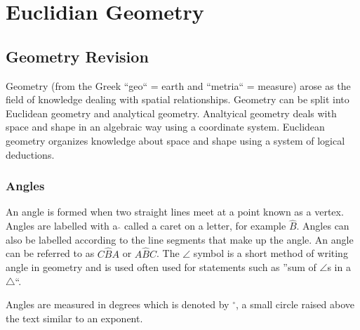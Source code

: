 \chapter{Euclidian Geometry}
\setcounter{figure}{1}
\setcounter{subfigure}{1}
\section{Geometry Revision}
\setcounter{figure}{1}
\setcounter{subfigure}{1}

Geometry (from the Greek ``geo`` = earth and ``metria`` = measure) arose as the field of knowledge
dealing with spatial relationships. Geometry can be split into Euclidean geometry and analytical geometry. 
Analtyical geometry deals with space and shape in an algebraic way using a coordinate system. 
Euclidean geometry organizes knowledge about space and shape using a system of logical deductions.\par 

\subsection*{Angles}
An angle is formed when two straight lines meet at a point known as a vertex. 
Angles are labelled with a $\hat{}$ called a caret on a letter, for example $\hat{B}$.
Angles can also be labelled according to the line segments that make up the
angle. An angle can be referred to as $C\hat{B}A$ or $A\hat{B}C$. 
The $\angle $ symbol is a short method of writing angle in
geometry and is used often used for statements such as ''sum of $\angle$s in a $\triangle$``.\par 
Angles are measured in degrees which is denoted by $^{\circ }$, a small circle
raised above the text similar to an exponent.\par 


